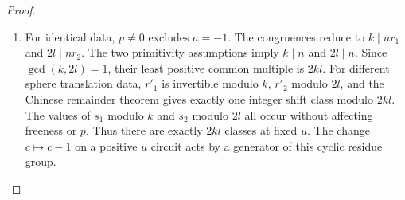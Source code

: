 \begin{proof}
\begin{enumerate}[label=\arabic*.,leftmargin=*]
\item For identical data, $p\ne0$ excludes $a=-1$. The congruences reduce to $k\mid nr_1$ and $2l\mid nr_2$. The two primitivity assumptions imply $k\mid n$ and $2l\mid n$. Since $\gcd(k,2l)=1$, their least positive common multiple is $2kl$. For different sphere translation data, $r'_1$ is invertible modulo $k$, $r'_2$ modulo $2l$, and the Chinese remainder theorem gives exactly one integer shift class modulo $2kl$. The values of $s_1$ modulo $k$ and $s_2$ modulo $2l$ all occur without affecting freeness or $p$. Thus there are exactly $2kl$ classes at fixed $u$. The change $c\mapsto c-1$ on a positive $u$ circuit acts by a generator of this cyclic residue group.

\end{enumerate}
\end{proof}